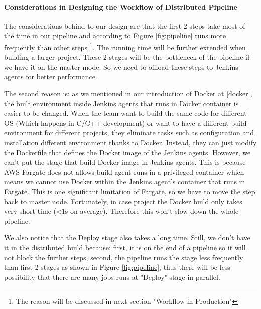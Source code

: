 \paragraph[]{Considerations in Designing the Workflow of Distributed Pipeline}
The considerations behind to our design are that the first 2 steps take most of the time in our pipeline and according to Figure \ref{fig:pipeline} runs more frequently than other steps \footnote{The reason will be discussed in next section "Workflow in Production"}. The running time will be further extended when building a larger project. These 2 stages will be the bottleneck of the pipeline if we have it on the master mode. So we need to offload these steps to Jenkins agents for better performance.
\par
The second reason is: as we mentioned in our introduction of Docker at \ref{docker}, the built environment inside Jenkins agents that runs in Docker container is easier to be changed. When the team want to build the same code for different OS (Which happens in C/C++ development) or want to have a different build environment for different projects, they eliminate tasks such as configuration and installation different environment thanks to Docker. Instead, they can just modify the Dockerfile that defines the Docker image of the Jenkins agents. However, we can't put the stage that build Docker image in Jenkins agents. This is because AWS Fargate does not allows build agent runs in a privileged container which means we cannot use Docker within the Jenkins agent's container that runs in Fargate. This is one significant limitation of Fargate, so we have to move the step back to master node. Fortunately, in case project the Docker build only takes very short time (<1s on average). Therefore this won't slow down the whole pipeline.
\par
We also notice that the Deploy stage also takes a long time. Still, we don't have it in the distributed build because: first, it is on the end of a pipeline so it will not block the further steps, second, the pipeline runs the stage less frequently than first 2 stages as shown in Figure \ref{fig:pipeline}, thus there will be less possibility that there are many jobs runs at "Deploy" stage in parallel.

